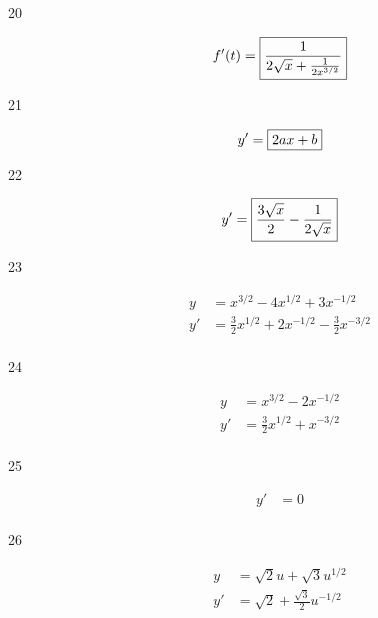 \documentclass[letterpaper, landscape]{exam}
\begin{document}
\begin{description}




    \item[20] 
      \[
        f'(t) = \boxed{ \frac{1}{2 \sqrt{x} + \frac{1}{2 x^{3/2}} } } \\
      \]

    \item[21] 
      \[
        y' = \boxed{ 2ax + b } \\
      \]

    \item[22] 
      \[
        y' = \boxed{ \frac{3 \sqrt{x}}{2}-\frac{1}{2 \sqrt{x}} } \\
      \]

    \item[23] 
      \begin{align*}
        y  & = x^{3/2} - 4x^{1/2} + 3x^{-1/2} \\
        y' & = \boxed{ \frac{3}{2}x^{1/2} + 2x^{-1/2} - \frac{3}{2} x^{-3/2} } \\
      \end{align*}

    \item[24] 
      \begin{align*}
        y  & = x^{3/2} - 2x^{-1/2} \\
        y' & = \boxed{ \frac{3}{2}x^{1/2} + x^{-3/2} } \\
      \end{align*}

    \item[25] 
      \begin{align*}
        y' & = \boxed{ 0 } \\
      \end{align*}

    \item[26] 
      \begin{align*}
        y  & = \sqrt{2} u + \sqrt{3} u^{1/2} \\
        y' & = \boxed{\sqrt{2} + \frac{\sqrt{3}}{2} u^{-1/2}} \\
      \end{align*}


\end{description}
\end{document}
